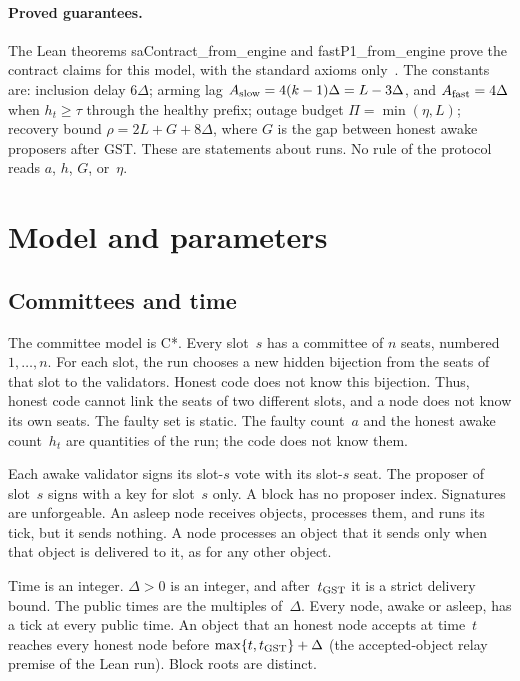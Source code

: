 \documentclass{article}
\theoremstyle{plain}
\theoremstyle{definition}
\theoremstyle{remark}
\newcommand{\lean}[1]{\textsf{#1}}
\begin{document}
\paragraph{Proved guarantees.}
The Lean theorems \lean{saContract\_from\_engine} and
\lean{fastP1\_from\_engine} prove the contract claims for this model,
with the standard axioms only~\cite{Lean}.  The constants are: inclusion
delay $6\Delta$; arming lag $A_{\rm slow}=4(k-1)\Delta=L-3\Delta$, and
$A_{\rm fast}=4\Delta$ when $h_t\geq\tau$ through the healthy prefix;
outage budget $\Pi=\min(\eta,L)$; recovery bound
$\rho=2L+G+8\Delta$, where $G$ is the gap between honest awake
proposers after GST.  These are statements about runs.  No rule of the
protocol reads $a$, $h$, $G$, or~$\eta$.

\section{Model and parameters}\label{sec:model}

\subsection{Committees and time}\label{sec:committees}

The committee model is C*.  Every slot~$s$ has a committee of $n$
seats, numbered $1,\dots,n$.  For each slot, the run chooses a new
hidden bijection from the seats of that slot to the validators.  Honest
code does not know this bijection.  Thus, honest code cannot link the
seats of two different slots, and a node does not know its own seats.
The faulty set is static.  The faulty count~$a$ and the honest awake
count~$h_t$ are quantities of the run; the code does not know them.

Each awake validator signs its slot-$s$ vote with its slot-$s$ seat.
The proposer of slot~$s$ signs with a key for slot~$s$ only.  A block
has no proposer index.  Signatures are unforgeable.  An asleep node
receives objects, processes them, and runs its tick, but it sends
nothing.  A node processes an object that it sends only when that object
is delivered to it, as for any other object.

Time is an integer.  $\Delta>0$ is an integer, and after~$t_{\rm GST}$
it is a strict delivery bound.  The public times are the multiples
of~$\Delta$.  Every node, awake or asleep, has a tick at every public
time.  An object that an honest node accepts at time~$t$ reaches every
honest node before $\max\{t,t_{\rm GST}\}+\Delta$ (the accepted-object
relay premise of the Lean run).  Block roots
are distinct.
\end{document}
